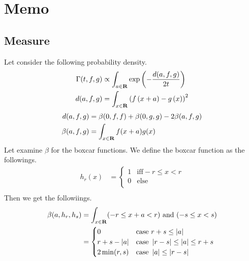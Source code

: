 \section{Memo}\label{sec:memorandom}
\newcommand{\rmapr}{M_{\mybf{R}}\mybf{R}}
\newcommand{\nmapr}{M_{\mybf{R}}\mybf{N}}
\newcommand{\zmapr}{M_{\mybf{R}}\mybf{Z}}
\newcommand{\loner}{L\mybf{R}}
\newcommand{\intallr}[1]{\int_{{#1}\in\mybf{R}}}

\subsection{Measure}
Let consider the following probability density.
\begin{equation}\begin{split}
	\Gamma(t,f,g) &\propto \intallr{a}\exp\kakko{-\frac{d(a, f,g)}{2t}} \\
	d(a,f,g) &= \intallr{x}\kakko{f\kakko{x+a}-g\kakko{x}}^2 \\
\end{split}\end{equation}
\begin{equation}\begin{split}
	d(a,f,g) &= \beta(0,f,f) + \beta(0,g,g) - 2\beta(a,f,g) \\
	\beta(a,f,g) &= \intallr{x}f(x+a)g(x) \\
\end{split}\end{equation}
Let examine $\beta$ for the boxcar functions. We define the boxcar function
as the followings.
\begin{equation}\begin{split}
	h_r(x) &= \begin{cases}
		1 & \text{iff} -r\le x< r \\
		0 & \text{else} \\
		\end{cases}\\
\end{split}\end{equation}
Then we get the followiings.
\begin{equation}\begin{split}
	\beta(a,h_r,h_s) &= \intallr{x}(-r\le x+a< r)\text{ and }(-s\le x< s) \\
		&= \begin{cases}
			0 & \text{case } r+s\le\zettai{a} \\
			r+s-\zettai{a} & \text{case } \zettai{r-s}\le\zettai{a}\le r+s \\
			2\min(r,s) & \text{case } \zettai{a}\le\zettai{r-s} \\
		\end{cases}\\
\end{split}\end{equation}
